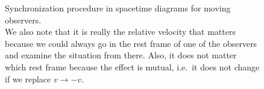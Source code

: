 \documentclass[../relativity_main.tex]{subfiles}
\begin{document}
\begin{figure}
\begin{minipage}{0.5\textwidth}
	
	\end{minipage}%
	\begin{minipage}{0.5\textwidth}
		\caption[Synchronization procedure in spacetime diagrams for moving observers]{Synchronization procedure in spacetime diagrams for moving observers.\\
		We also note that it is really the relative velocity that matters because we could always go in the rest frame of one of the observers and examine the situation from there. Also, it does not matter which rest frame because the effect is mutual, i.e.~it does not change if we replace $v \rightarrow -v$.
		}
		\label{fig:moving_clocks}
	\end{minipage}
\end{figure}


%	
%	
%	
\end{document}
